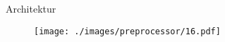 \begin{frame}{Architektur}
    \begin{figure}
    	\centering
    	\texttt{[image: ./images/preprocessor/16.pdf]}
    \end{figure}
\end{frame}
